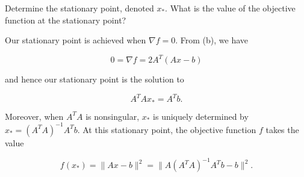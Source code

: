Determine the stationary point, denoted $x_*$. What is the value of the objective function at the stationary point?

\begin{solution}
  Our stationary point is achieved when $\nabla f = 0$. From (b), we have

  $$
  0 = \nabla f = 2A^T (Ax - b)
  $$

  and hence our stationary point is the solution to 

  $$
  A^T A x_* = A^T b.
  $$

  Moreover, when $A^T A$ is nonsingular, $x_*$ is uniquely determined by $x_* = (A^T A)^{-1} A^T b$.
  At this stationary point, the objective function $f$ takes the value

  $$
  f(x_*) = \lVert Ax - b \rVert^2 = \lVert A \left( A^T A \right)^{-1} A^T b - b\rVert^2.
  $$
\end{solution}